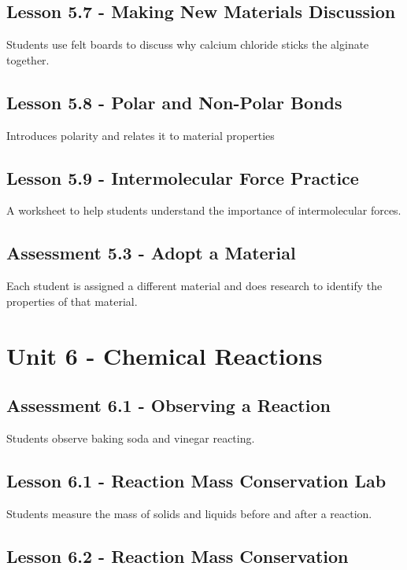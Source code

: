 \documentclass[12pt]{article}
\begin{document}
\subsection{Lesson 5.7 - Making New Materials Discussion}

Students use felt boards to discuss why calcium chloride sticks the alginate together.

\subsection{Lesson 5.8 - Polar and Non-Polar Bonds}

Introduces polarity and relates it to material properties

\subsection{Lesson 5.9 - Intermolecular Force Practice} 

A worksheet to help students understand the importance of intermolecular forces.

\subsection*{Assessment 5.3 - Adopt a Material}

Each student is assigned a different material and does research to identify the properties of that material.

\section{Unit 6 - Chemical Reactions}

\subsection*{Assessment 6.1 - Observing a Reaction}

Students observe baking soda and vinegar reacting.

\subsection{Lesson 6.1 - Reaction Mass Conservation Lab} 

Students measure the mass of solids and liquids before and after a reaction.

\subsection{Lesson 6.2 - Reaction Mass Conservation} 
\end{document}
